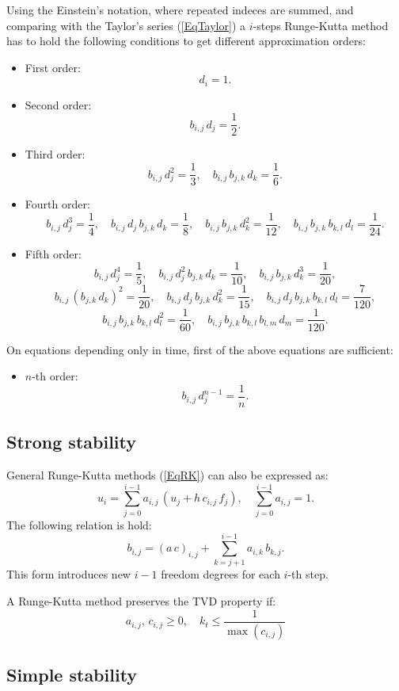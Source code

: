 \documentclass[a4paper]{article}
\newcommand{\EQ}[2]{\begin{equation}#1\label{#2}\end{equation}}
\newcommand{\PA}[1]{\left(#1\right)}
\begin{document}
Using the Einstein's notation, where repeated indeces are summed, and comparing
with the Taylor's series (\ref{EqTaylor}) a $i$-steps Runge-Kutta method has to
hold the following conditions to get different approximation orders:
\begin{itemize}
\item First order:
	\EQ{d_i=1.}{EqRKI}
\item Second order:
	\EQ{b_{i,j}\,d_j=\frac12.}{EqRKII}
\item Third order:
	\EQ
	{
		b_{i,j}\,d_j^2=\frac13,\quad
		b_{i,j}\,b_{j,k}\,d_k=\frac16.
	}{EqRKIII}
\item Fourth order:
	\EQ
	{
		b_{i,j}\,d_j^3=\frac14,\quad
		b_{i,j}\,d_j\,b_{j,k}\,d_k=\frac18,\quad
		b_{i,j}\,b_{j,k}\,d_k^2=\frac1{12},\quad
		b_{i,j}\,b_{j,k}\,b_{k,l}\,d_l=\frac1{24}.
	}{EqRKIV}
\item Fifth order:
	\[
		b_{i,j}\,d_j^4=\frac15,\quad
		b_{i,j}\,d_j^2\,b_{j,k}\,d_k=\frac1{10},\quad
		b_{i,j}\,b_{j,k}\,d_k^3=\frac1{20},
	\]
	\[
		b_{i,j}\,\PA{b_{j,k}\,d_k}^2=\frac1{20},\quad
		b_{i,j}\,d_j\,b_{j,k}\,d_k^2=\frac1{15},\quad
		b_{i,j}\,d_j\,b_{j,k}\,b_{k,l}\,d_l=\frac7{120},
	\]
	\EQ
	{
		b_{i,j}\,b_{j,k}\,b_{k,l}\,d_l^2=\frac1{60},\quad
		b_{i,j}\,b_{j,k}\,b_{k,l}\,b_{l,m}\,d_m=\frac1{120}.
	}{EqRKV}
\end{itemize}

On equations depending only in time, first of the above equations are
sufficient:
\begin{itemize}
\item $n$-th order:
	\EQ{b_{i,j}\,d_j^{n-1}=\frac1n.}{EqRKt}
\end{itemize}

\subsection{Strong stability}

General Runge-Kutta methods (\ref{EqRK}) can also be expressed as:
\EQ
{
	u_i=\sum_{j=0}^{i-1}a_{i,j}\,\PA{u_j+h\,c_{i,j}\,f_j},\quad
	\sum_{j=0}^{i-1}a_{i,j}=1.
}{EqRKac}
The following relation is hold:
\EQ{b_{i,j}=(a\,c)_{i,j}+\sum_{k=j+1}^{i-1}a_{i,k}\,b_{k,j}.}{EqRKacb}
This form introduces new $i-1$ freedom degrees for each $i$-th step.

A Runge-Kutta method preserves the TVD property if:
\EQ{a_{i,j},\,c_{i,j}\geq0,\quad k_t\leq\frac1{\max\PA{c_{i,j}}}}{EqRKTVD}

\subsection{Simple stability}
\end{document}
